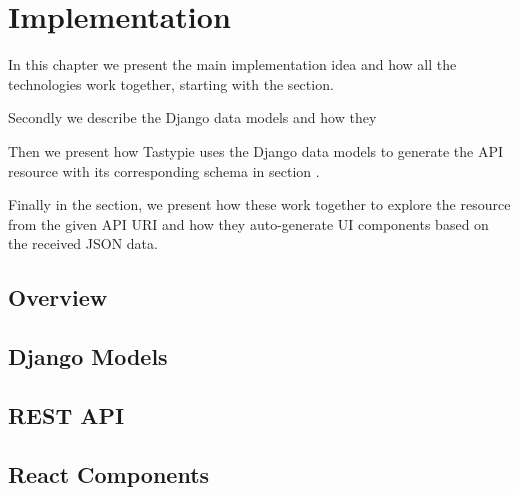 \chapter{Implementation}
\label{chapter:implementation}

In this chapter we present the main implementation idea and how all the technologies work together, starting with the  section.

Secondly we describe the Django data models and how they 

Then we present how Tastypie uses the Django data models to generate the API resource with its corresponding schema in section .

Finally in the  section, we present how these work together to explore the resource from the given API URI and how they auto-generate UI components based on the received JSON data.

\section{Overview}
\label{sec:overview}


\section{Django Models}
\label{sec:django-models}


\section{REST API}
\label{sec:api}


\section{React Components}
\label{sec:react0components}

